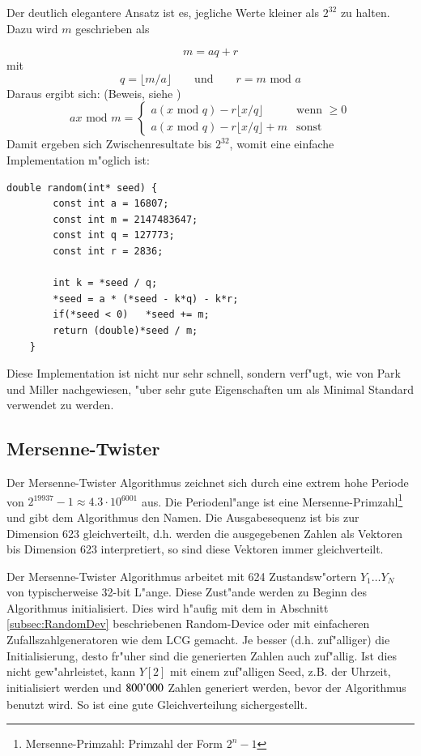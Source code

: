 \begin{refsection}
Der deutlich elegantere Ansatz ist es, jegliche Werte kleiner als $2^{32}$
zu halten. Dazu wird $m$ geschrieben als

\begin{equation}
	m = aq + r
\end{equation}
mit 
\begin{equation}
	q = \lfloor m/a \rfloor \qquad \text{und} \qquad r = m \text{ mod } a
\end{equation}
Daraus ergibt sich: (Beweis, siehe \cite{rng:ParkMiller1988})
\begin{equation}
	a x \text{ mod } m = 
		\begin{cases}
			a \left(x \text{ mod } q\right) - r \lfloor x / q\rfloor & \text{wenn }\geq 0 \\
			a \left(x \text{ mod } q\right) - r \lfloor x / q\rfloor + m & \text{sonst}
		\end{cases}
\end{equation}
Damit ergeben sich Zwischenresultate bis $2^{32}$, womit eine einfache
Implementation m"oglich ist:

\begin{lstlisting}[style=C]
	double random(int* seed) {
		const int a = 16807;
		const int m = 2147483647;
		const int q = 127773;
		const int r = 2836;
		
		int k = *seed / q;
		*seed = a * (*seed - k*q) - k*r;
		if(*seed < 0)   *seed += m;
		return (double)*seed / m;
	}
\end{lstlisting}
Diese Implementation ist nicht nur sehr schnell, sondern verf"ugt, wie
von Park und Miller \cite{rng:ParkMiller1988} nachgewiesen, "uber sehr
gute Eigenschaften um als Minimal Standard verwendet zu werden.

\subsection{Mersenne-Twister} \label{subsec:MersenneTwister}
Der Mersenne-Twister Algorithmus zeichnet sich durch eine extrem
hohe Periode von $2^{19937}-1 \approx 4.3 \cdot 10^{6001}$ aus. Die
Periodenl"ange ist eine Mersenne-Primzahl\footnote{Mersenne-Primzahl:
Primzahl der Form $2^{n}-1$} und gibt dem Algorithmus den Namen. Die
Ausgabesequenz ist bis zur Dimension 623 gleichverteilt, d.h. werden
die ausgegebenen Zahlen als Vektoren bis Dimension 623 interpretiert,
so sind diese Vektoren immer gleichverteilt.

Der Mersenne-Twister Algorithmus arbeitet mit 624 Zustandsw"ortern
$Y_1 \dots Y_N$ von typischerweise 32-bit L"ange. Diese Zust"ande
werden zu Beginn des Algorithmus initialisiert. Dies wird h"aufig mit
dem in Abschnitt \ref{subsec:RandomDev} beschriebenen Random-Device
oder mit einfacheren Zufallszahlgeneratoren wie dem LCG gemacht. Je
besser (d.h. zuf"alliger) die Initialisierung, desto fr"uher sind die
generierten Zahlen auch zuf"allig. Ist dies nicht gew"ahrleistet, kann
$Y[2]$ mit einem zuf"alligen Seed, z.B. der Uhrzeit, initialisiert
werden und $800\text{\strut'}000$ Zahlen generiert werden, bevor der Algorithmus
benutzt wird. So ist eine gute Gleichverteilung sichergestellt.


\end{refsection}
